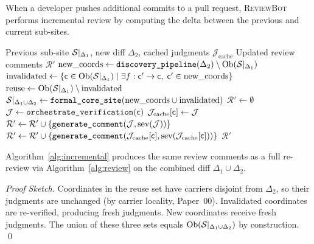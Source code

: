 \documentclass[11pt]{article}
\newcommand{\ReviewBot}{\textsc{ReviewBot}}
\newcommand{\Severity}{\mathrm{sev}}
\begin{document}
When a developer pushes additional commits to a pull request, \ReviewBot{}
performs incremental review by computing the delta between the previous
and current sub-sites.

\begin{algorithm}[t]
\caption{Incremental Review via Site Delta}
\label{alg:incremental}
\begin{algorithmic}[1]
\REQUIRE Previous sub-site $\mathcal{S}|_{\Delta_1}$, new diff $\Delta_2$,
         cached judgments $\mathcal{J}_{\text{cache}}$
\ENSURE Updated review comments $\mathcal{R}'$
\STATE $\text{new\_coords} \gets
       \texttt{discovery\_pipeline}(\Delta_2) \setminus
       \mathrm{Ob}(\mathcal{S}|_{\Delta_1})$
\STATE $\text{invalidated} \gets \{\mathsf{c} \in \mathrm{Ob}(\mathcal{S}|_{\Delta_1})
       \mid \exists f : \mathsf{c}' \to \mathsf{c},\;
       \mathsf{c}' \in \text{new\_coords}\}$
\STATE $\text{reuse} \gets \mathrm{Ob}(\mathcal{S}|_{\Delta_1}) \setminus
       \text{invalidated}$
\STATE $\mathcal{S}|_{\Delta_1 \cup \Delta_2} \gets
       \texttt{formal\_core\_site}(\text{new\_coords} \cup
       \text{invalidated})$
\STATE $\mathcal{R}' \gets \emptyset$
  \STATE $\mathcal{J} \gets \texttt{orchestrate\_verification}(\mathsf{c})$
  \STATE $\mathcal{J}_{\text{cache}}[\mathsf{c}] \gets \mathcal{J}$
  \STATE $\mathcal{R}' \gets \mathcal{R}' \cup
         \{\texttt{generate\_comment}(\J, \Severity(\J))\}$
\ENDFOR
{}
  \STATE $\mathcal{R}' \gets \mathcal{R}' \cup
         \{\texttt{generate\_comment}(
           \mathcal{J}_{\text{cache}}[\coord],
           \Severity(\mathcal{J}_{\text{cache}}[\coord]))\}$
\ENDFOR
\RETURN $\mathcal{R}'$
\end{algorithmic}
\end{algorithm}

\begin{theorem}\label{thm:incremental}
Algorithm~\ref{alg:incremental} produces the same review comments as a
full re-review via Algorithm~\ref{alg:review} on the combined diff
$\Delta_1 \cup \Delta_2$.
\end{theorem}

\begin{proof}[Proof Sketch]
Coordinates in the reuse set have carriers disjoint from $\Delta_2$, so
their judgments are unchanged (by carrier locality, Paper~00). Invalidated
coordinates are re-verified, producing fresh judgments. New coordinates
receive fresh judgments. The union of these three sets equals
$\mathrm{Ob}(\mathcal{S}|_{\Delta_1 \cup \Delta_2})$ by construction. \qed
\end{proof}
\end{document}
